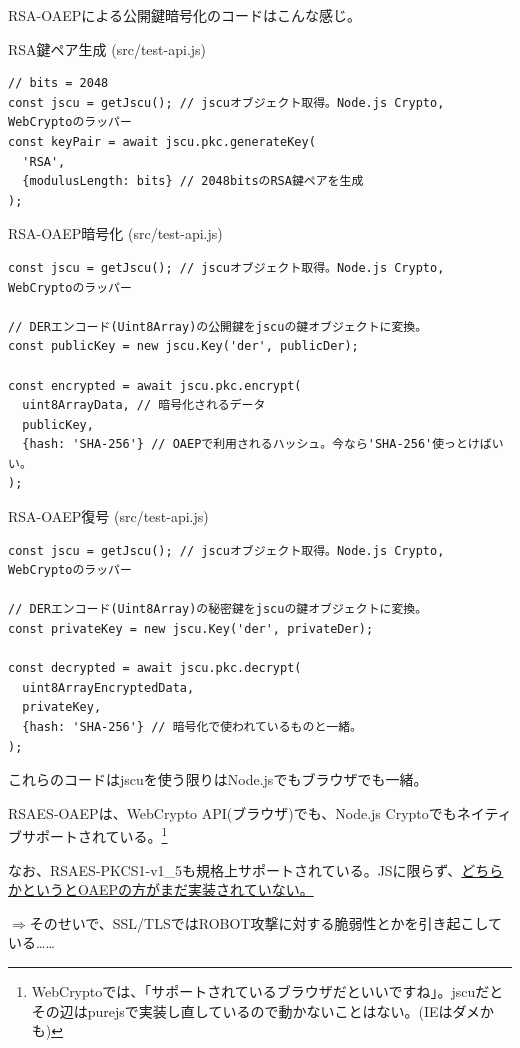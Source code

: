 \documentclass[12pt,dvipdfmx]{beamer}
\begin{document}
\begin{frame}[fragile]
RSA-OAEPによる公開鍵暗号化のコードはこんな感じ。
\begin{block}{\small RSA鍵ペア生成 (src/test-api.js)}
\scriptsize
\begin{verbatim}
// bits = 2048
const jscu = getJscu(); // jscuオブジェクト取得。Node.js Crypto, WebCryptoのラッパー
const keyPair = await jscu.pkc.generateKey(
  'RSA', 
  {modulusLength: bits} // 2048bitsのRSA鍵ペアを生成
); 
\end{verbatim}
\end{block}
\begin{block}{\small RSA-OAEP暗号化 (src/test-api.js)}
\scriptsize
\begin{verbatim}
const jscu = getJscu(); // jscuオブジェクト取得。Node.js Crypto, WebCryptoのラッパー

// DERエンコード(Uint8Array)の公開鍵をjscuの鍵オブジェクトに変換。
const publicKey = new jscu.Key('der', publicDer);

const encrypted = await jscu.pkc.encrypt(
  uint8ArrayData, // 暗号化されるデータ
  publicKey,
  {hash: 'SHA-256'} // OAEPで利用されるハッシュ。今なら'SHA-256'使っとけばいい。
);
\end{verbatim}
\end{block}
\end{frame}
\begin{frame}[fragile]
\begin{block}{\small RSA-OAEP復号 (src/test-api.js)}
\scriptsize
\begin{verbatim}
const jscu = getJscu(); // jscuオブジェクト取得。Node.js Crypto, WebCryptoのラッパー

// DERエンコード(Uint8Array)の秘密鍵をjscuの鍵オブジェクトに変換。
const privateKey = new jscu.Key('der', privateDer);

const decrypted = await jscu.pkc.decrypt(
  uint8ArrayEncryptedData,
  privateKey,
  {hash: 'SHA-256'} // 暗号化で使われているものと一緒。
);
\end{verbatim}
\end{block}
これらのコードはjscuを使う限りはNode.jsでもブラウザでも一緒。
\end{frame}

\begin{frame}
RSAES-OAEPは、WebCrypto API(ブラウザ)でも、Node.js Cryptoでもネイティブサポートされている。\footnote[frame]{\scriptsize WebCryptoでは、「サポートされているブラウザだといいですね」。jscuだとその辺はpurejsで実装し直しているので動かないことはない。(IEはダメかも)}

\vspace{1ex}

なお、RSAES-PKCS1-v1\_5も規格上サポートされている。JSに限らず、\underline{どちらかというとOAEPの方がまだ実装されていない。}

\vspace{1ex}

$\Rightarrow $そのせいで、SSL/TLSではROBOT攻撃に対する脆弱性とかを引き起こしている……
\end{frame}
\end{document}
